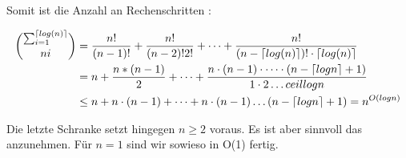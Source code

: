 \documentclass{article}
\def\mathify#1{\ifmmode{#1}\else\mbox{$#1$}\fi} %
\newcommand{\ceil}[1]{\mathify{\left\lceil {#1}\right\rceil}}
\begin{document}
			Somit ist die Anzahl an Rechenschritten :

			\begin{align*}
				\sum_{i=1}^{\ceil{log(n)}} \choose{n}{i} &= \frac{n!}{(n-1)!} + \frac{n!}{(n-2)!2!}+\cdots+\frac{n!}{(n-\ceil{log (n)})!\cdot \ceil{log(n)}} \\
				&= n + \frac{n * (n-1)}{2} + \dots + \frac{n \cdot (n-1) \cdot \dots \cdot (n- \ceil{log n}+1)}{1 \cdot 2 \dots ceil{log n}} \\
				&\leq n + n\cdot (n-1) + \dots + n \cdot (n-1) \dots (n- \ceil{log n} +1) = n^{O(log n)} 
			\end{align*}

			Die letzte Schranke setzt hingegen $n \geq 2$ voraus. Es ist aber sinnvoll das anzunehmen.
			Für $n=1$ sind wir sowieso in O(1) fertig. 
			
\end{document}
